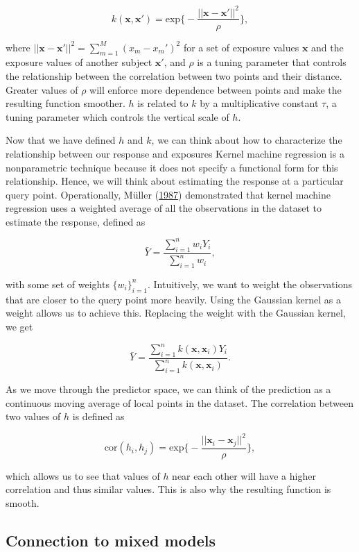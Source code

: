 \documentclass[12pt, twoside]{amherstthesis}
\begin{document}
\[
k(\textbf{x}, \textbf{x}') = \textrm{exp}\bigg\{
-\frac{||\textbf{x}-\textbf{x}'||^2}{\rho} \bigg\},
\]

\noindent where \(||\textbf{x}-\textbf{x}'||^2 = \sum_{m=1}^M{(x_{m}-x_{m}')^2}\) for a set of exposure values \(\textbf{x}\) and the exposure values of another subject \(\textbf{x}'\), and \(\rho\) is a tuning parameter that controls the relationship between the correlation between two points and their distance. Greater values of \(\rho\) will enforce more dependence between points and make the resulting function smoother. \(h\) is related to \(k\) by a multiplicative constant \(\tau\), a tuning parameter which controls the vertical scale of \(h\).

Now that we have defined \(h\) and \(k\), we can think about how to characterize the relationship between our response and exposures Kernel machine regression is a nonparametric technique because it does not specify a functional form for this relationship. Hence, we will think about estimating the response at a particular query point. Operationally, Müller (\protect\hyperlink{ref-muller_weighted_1987}{1987}) demonstrated that kernel machine regression uses a weighted average of all the observations in the dataset to estimate the response, defined as

\[
\bar{Y} = \frac{\sum_{i=1}^nw_iY_i}{\sum_{i=1}^nw_i},
\]

\noindent with some set of weights \(\{w_i\}_{i=1}^n\). Intuitively, we want to weight the observations that are closer to the query point more heavily. Using the Gaussian kernel as a weight allows us to achieve this. Replacing the weight with the Gaussian kernel, we get

\[
\bar{Y} = \frac{\sum_{i=1}^n k(\textbf{x}, \textbf{x}_i) Y_i}
{\sum_{i=1}^n k(\textbf{x}, \textbf{x}_i)}.
\]

As we move through the predictor space, we can think of the prediction as a continuous moving average of local points in the dataset. The correlation between two values of \(h\) is defined as

\[
\textrm{cor}(h_i, h_j) = \textrm{exp} \bigg\{-\frac{||
\textbf{x}_{i}-\textbf{x}_{j}||^2}{\rho} \bigg\},
\]

\noindent which allows us to see that values of \(h\) near each other will have a higher correlation and thus similar values. This is also why the resulting function is smooth.

\hypertarget{connection-to-mixed-models}{%
\subsection{Connection to mixed models}\label{connection-to-mixed-models}}
\end{document}
